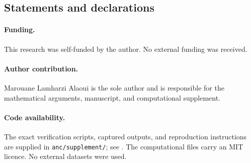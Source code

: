 \subsection*{Statements and declarations}
\paragraph{Funding.} This research was self-funded by the author. No external funding was received.
\paragraph{Author contribution.} Marouane Lamharzi Alaoui is the sole author and is responsible for the mathematical arguments, manuscript, and computational supplement.
\paragraph{Code availability.} The exact verification scripts, captured outputs, and reproduction instructions are supplied in \texttt{anc/supplement/}; see . The computational files carry an MIT licence. No external datasets were used.


